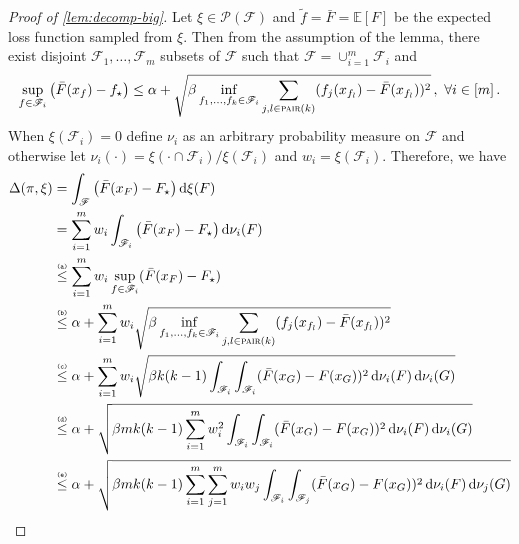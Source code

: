 \documentclass[letter, 12pt]{report}
\newcommand{\pair}{\operatorname{\textsc{pair}}}
\newcommand{\explan}[1]{\stackrel{\text{\tiny \texttt{#1}}}}
\newcommand{\E}{\mathbb E}
\newcommand{\sF}{\mathscr F}
\newcommand{\sP}{\mathscr P}
\renewcommand{\d}[1]{\operatorname{d}\!#1}
\newcommand{\1}{\mathbf{1}}
\theoremstyle{plain}
\theoremstyle{definition}
\theoremstyle{remark}
\begin{document}
\begin{proof}[Proof of \cref{lem:decomp-big}]
    Let $\xi \in \sP(\sF)$ and $\tilde{f} = \bar{F} = \E[F]$ be the expected loss function sampled from $\xi$.
    Then from the assumption of the lemma, there exist disjoint
    $\sF_1,\ldots,\sF_m$ subsets of $\sF$ such that $\sF = \cup_{i=1}^m \sF_i$ and
    \begin{align}
        \sup_{f \in \sF_i} \left(\bar F(x_f) - f_\star\right) \leq \alpha + \sqrt{\beta \inf_{f_1,\ldots,f_k \in \sF_i} \sum_{j, l \in \pair(k)} (f_j(x_{f_l}) - \bar F(x_{f_l}))^2}  \,,\,\, \forall i \in [m] \,.
        \label{eq:decomp:1}
    \end{align}
    When $\xi(\sF_i)=0$ define $\nu_i$ as an arbitrary probability measure on $\sF$ and otherwise let
    $\nu_i(\cdot) = \xi(\cdot \cap \sF_i) / \xi(\sF_i)$ and $w_i = \xi(\sF_i)$.
    Therefore, we have
    \begin{align}
        \Delta(\pi, \xi)
         & = \int_\sF \left(\bar F(x_F) - F_\star\right) \d{\xi}(F)
        \nonumber                                                                                                                                                                   \\
         & = \sum_{i=1}^m w_i \int_{\sF_i} \left(\bar F(x_F) - F_\star\right) \d{\nu_i}(F)
        \nonumber                                                                                                                                                                   \\
         & \explan{(a)}\leq \sum_{i=1}^m w_i \sup_{f \in \sF_i} (\bar F(x_F) - F_\star) \nonumber                                                                                   \\
         & \explan{(b)}\leq \alpha + \sum_{i=1}^m w_i \sqrt{\beta \inf_{f_1,\ldots,f_k \in \sF_i} \sum_{j,l \in \pair(k)} (f_j(x_{f_l}) - \bar F(x_{f_l}))^2} \nonumber             \\
         & \explan{(c)}\leq \alpha + \sum_{i=1}^m w_i \sqrt{\beta k(k-1) \int_{\sF_i} \int_{\sF_i} (\bar F(x_G) - F(x_G))^2 \d{\nu_i}(F) \d{\nu_i}(G)} \nonumber                    \\
         & \explan{(d)}\leq \alpha + \sqrt{\beta m k(k-1) \sum_{i=1}^m w_i^2 \int_{\sF_i} \int_{\sF_i} (\bar F(x_G) - F(x_G))^2 \d{\nu_i}(F) \d{\nu_i}(G)} \nonumber                \\
         & \explan{(e)}\leq \alpha + \sqrt{\beta m k(k-1) \sum_{i=1}^m \sum_{j=1}^m w_i w_j \int_{\sF_i} \int_{\sF_j} (\bar F(x_G) - F(x_G))^2 \d{\nu_i}(F) \d{\nu_j}(G)} \nonumber \\

\end{align}
\end{proof}
\end{document}

